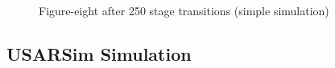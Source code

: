 \documentclass[11pt]{article}
\begin{document}
\begin{figure}[ht]
\centering



\caption{Figure-eight after 250 stage transitions (simple simulation)}
\end{figure}


\subsection{USARSim Simulation}
\end{document}
